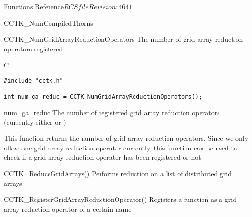 \begin{cactuspart}{ Functions Reference}{$RCSfile$}{$Revision: 4641 $}
\begin{FunctionDescription}{CCTK\_NumCompiledThorns}

\end{FunctionDescription}


\begin{FunctionDescription}{CCTK\_NumGridArrayReductionOperators}
\label{CCTK-NumGridArrayReductionOperators}
The number of grid array reduction operators registered

\begin{SynopsisSection}
\begin{Synopsis}{C}
\begin{verbatim}
#include "cctk.h"

int num_ga_reduc = CCTK_NumGridArrayReductionOperators();
\end{verbatim}
\end{Synopsis}
\end{SynopsisSection}

\begin{ResultSection}
\begin{Result}{num\_ga\_reduc}
The number of registered grid array reduction operators (currently either 
 or )
\end{Result}
\end{ResultSection}


\begin{Discussion}
This function returns the number of grid array reduction operators. Since we only allow one grid array reduction operator currently, this function can be used to check if a
grid array reduction operator has been registered or not.
\end{Discussion}

\begin{SeeAlsoSection}
\begin{SeeAlso}{CCTK\_ReduceGridArrays()}
Performs reduction on a list of distributed grid arrays
\end{SeeAlso}

\begin{SeeAlso}{CCTK\_RegisterGridArrayReductionOperator()}
Registers a function as a grid array reduction operator of a certain name
\end{SeeAlso}


\end{SeeAlsoSection}
\end{FunctionDescription}
\end{cactuspart}
